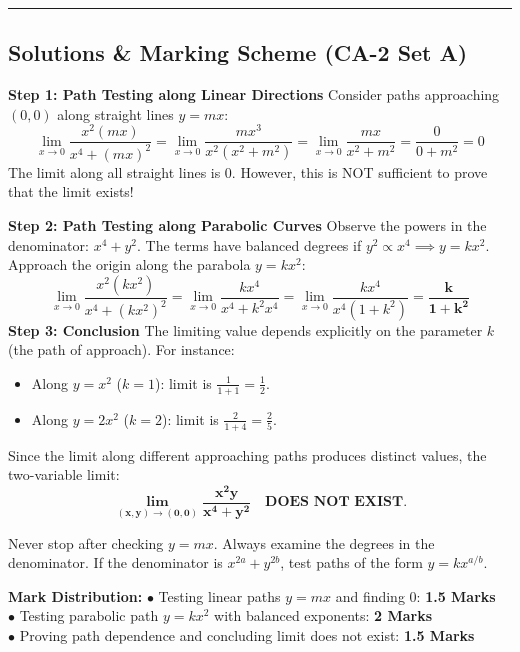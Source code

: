 \vspace{5mm}
\hrule
\vspace{5mm}

\subsection*{Solutions \& Marking Scheme (CA-2 Set A)}

\begin{solutionbox}
\textbf{Step 1: Path Testing along Linear Directions}
Consider paths approaching $(0,0)$ along straight lines $y = mx$:
\[
\lim_{x\to 0} \frac{x^2 (mx)}{x^4 + (mx)^2} = \lim_{x\to 0} \frac{m x^3}{x^2(x^2 + m^2)} = \lim_{x\to 0} \frac{mx}{x^2 + m^2} = \frac{0}{0 + m^2} = 0
\]
The limit along all straight lines is 0. However, this is NOT sufficient to prove that the limit exists!

\textbf{Step 2: Path Testing along Parabolic Curves}
Observe the powers in the denominator: $x^4 + y^2$. The terms have balanced degrees if $y^2 \propto x^4 \implies y = k x^2$.
Approach the origin along the parabola $y = k x^2$:
\[
\lim_{x\to 0} \frac{x^2 (k x^2)}{x^4 + (k x^2)^2} = \lim_{x\to 0} \frac{k x^4}{x^4 + k^2 x^4} = \lim_{x\to 0} \frac{k x^4}{x^4(1 + k^2)} = \mathbf{\frac{k}{1 + k^2}}
\]
\textbf{Step 3: Conclusion}
The limiting value depends explicitly on the parameter $k$ (the path of approach). For instance:
\begin{itemize}[leftmargin=6mm]
    \item Along $y = x^2$ ($k = 1$): limit is $\frac{1}{1 + 1} = \frac{1}{2}$.
    \item Along $y = 2x^2$ ($k = 2$): limit is $\frac{2}{1 + 4} = \frac{2}{5}$.
\end{itemize}
Since the limit along different approaching paths produces distinct values, the two-variable limit:
\[
\mathbf{\lim_{(x,y)\to (0,0)} \frac{x^2 y}{x^4 + y^2} \quad \text{DOES NOT EXIST}.}
\]

\begin{examinertip}
Never stop after checking $y = mx$. Always examine the degrees in the denominator. If the denominator is $x^{2a} + y^{2b}$, test paths of the form $y = k x^{a/b}$.
\end{examinertip}

\begin{markingrubric}
\textbf{Mark Distribution:}
$\bullet$ Testing linear paths $y = mx$ and finding 0: \textbf{1.5 Marks}\\
$\bullet$ Testing parabolic path $y = k x^2$ with balanced exponents: \textbf{2 Marks}\\
$\bullet$ Proving path dependence and concluding limit does not exist: \textbf{1.5 Marks}
\end{markingrubric}
\end{solutionbox}

